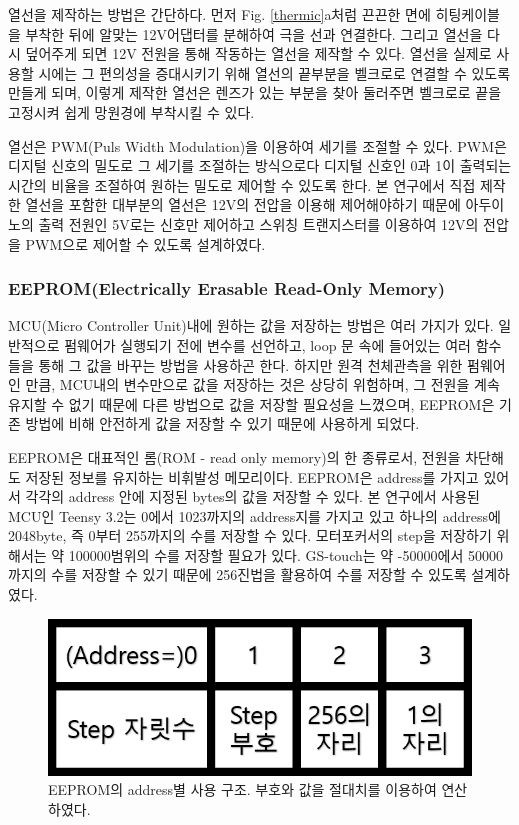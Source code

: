 \documentclass[twoside,11pt]{gshs_thesis}
\begin{document}
 열선을 제작하는 방법은 간단하다. 먼저 Fig. \ref{thermic}a처럼 끈끈한 면에 히팅케이블을 부착한 뒤에 알맞는 12V어댑터를 분해하여 극을 선과 연결한다. 그리고 열선을 다시 덮어주게 되면 12V 전원을 통해 작동하는 열선을 제작할 수 있다. 열선을 실제로 사용할 시에는 그 편의성을 증대시키기 위해 열선의 끝부분을 벨크로로 연결할 수 있도록 만들게 되며, 이렇게 제작한 열선은 렌즈가 있는 부분을 찾아 둘러주면 벨크로로 끝을 고정시켜 쉽게 망원경에 부착시킬 수 있다.

 열선은 PWM(Puls Width Modulation)을 이용하여 세기를 조절할 수 있다. PWM은 디지털 신호의 밀도로 그 세기를 조절하는 방식으로다 디지털 신호인 0과 1이 출력되는 시간의 비율을 조절하여 원하는 밀도로 제어할 수 있도록 한다. 본 연구에서 직접 제작한 열선을 포함한 대부분의 열선은 12V의 전압을 이용해 제어해야하기 때문에 아두이노의 출력 전원인 5V로는 신호만 제어하고 스위칭 트랜지스터를 이용하여 12V의 전압을 PWM으로 제어할 수 있도록 설계하였다.

\subsubsection{EEPROM(Electrically Erasable Read-Only Memory)}

  MCU(Micro Controller Unit)내에 원하는 값을 저장하는 방법은 여러 가지가 있다. 일반적으로 펌웨어가 실행되기 전에 변수를 선언하고, loop 문 속에 들어있는 여러 함수들을 통해 그 값을 바꾸는 방법을 사용하곤 한다. 하지만 원격 천체관측을 위한 펌웨어인 만큼, MCU내의 변수만으로 값을 저장하는 것은 상당히 위험하며, 그 전원을 계속 유지할 수 없기 때문에 다른 방법으로 값을 저장할 필요성을 느꼈으며, EEPROM은 기존 방법에 비해 안전하게 값을 저장할 수 있기 때문에 사용하게 되었다.
  
  EEPROM은 대표적인 롬(ROM - read only memory)의 한 종류로서, 전원을 차단해도 저장된 정보를 유지하는 비휘발성 메모리이다. EEPROM은 address를 가지고 있어서 각각의 address 안에 지정된 bytes의 값을 저장할 수 있다. 본 연구에서 사용된 MCU인 Teensy 3.2는 0에서 1023까지의 address지를 가지고 있고 하나의 address에 2048byte, 즉 0부터 255까지의 수를 저장할 수 있다. 모터포커서의 step을 저장하기 위해서는 약 100000범위의 수를 저장할 필요가 있다. GS-touch는 약 -50000에서 50000까지의 수를 저장할 수 있기 때문에 256진법을 활용하여 수를 저장할 수 있도록 설계하였다.
\begin{figure}[h]
	\begin{center}
		\includegraphics[width = 5 cm]{eeprom1}
	\end{center}
	\caption{EEPROM의 address별 사용 구조. 부호와 값을 절대치를 이용하여 연산하였다.}
	\label{eeprom1}
\end{figure}
\end{document}
